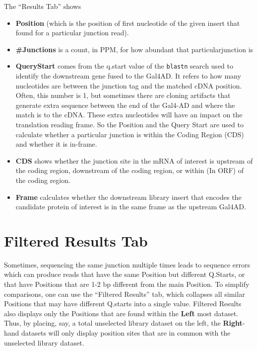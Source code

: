 \documentclass[11pt,fleqn]{book} %
\begin{document}
The ``Results Tab'' shows

\begin{itemize}
    \item \textbf{Position} (which is the position of first nucleotide of the given insert that found for a particular junction read). 
    \item \textbf{\#Junctions} is a count, in PPM, for how abundant that particularjunction is
    \item \textbf{QueryStart} comes from the q.start value of the \texttt{blastn} search used to identify the downstream gene fused to the Gal4AD.  It refers to how many nucleotides are between the junction tag and the matched cDNA position. Often, this number is 1, but sometimes there are cloning artifacts that generate extra sequence between the end of the Gal4-AD and where the match is to the cDNA.  These extra nucleotides will have an impact on the translation reading frame.  So the Position and the Query Start are used to calculate whether a particular junction is within the Coding Region (CDS) and whether it is in-frame.
    \item \textbf{CDS} shows whether the junction site in the mRNA of interest is upstream of the coding region, downstream of the coding region, or within (In ORF) of the coding region.
    \item \textbf{Frame} calculates whether the downstream library insert that encodes the candidate protein of interest is in the same frame as the upstream Gal4AD.
\end{itemize}

\section{Filtered Results Tab}

Sometimes, sequencing the same junction multiple times leads to sequence errors which can produce reads that have the same Position but different Q.Starts, or that have Positions that are 1-2 bp different from the main Position.  To simplify comparisons, one can use the ``Filtered Results'' tab, which collapses all similar Positions that may have different Q.starts into a single value. Filtered Results also displays only the Positions that are found within the \textbf{Left} most dataset. Thus, by placing, say, a total unselected library dataset on the left, the \textbf{Right}-hand datasets will only display position sites that are in common with the unselected library dataset.
\end{document}
